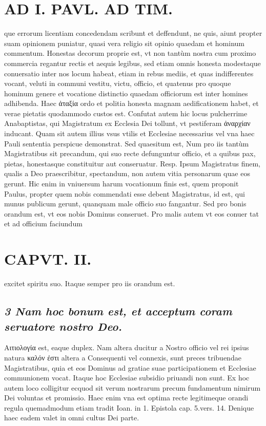 \documentclass{article}
\begin{document}
\begin{pages}
\section*{AD I. PAVL. AD TIM. }
\marginpar{[ p.50 ]}\pstart que errorum licentiam concedendam scribunt et deffendunt, ne quis, aiunt propter suam opinionem puniatur, quasi vera religio sit opinio quaedam et hominum commentum.  \pend\pstart Honestas decorum proprie est, vt non tantùm nostra cum proximo commercia regantur rectis et aequis legibus, sed etiam omnis honesta modestaque conuersatio inter nos locum habeat, etiam in rebus mediis, et quas indifferentes vocant, veluti in communi vestitu, victu, officio, et quatenus pro quoque hominum genere et vocatione distinctio quaedam officiorum est inter homines adhibenda. Haec ἀταξία ordo et politia honesta magnam aedificationem habet, et verae pietatis quodammodo custos est.  \pend\pstart Confutat autem hic locus pulcherrime Anabaptistas, qui Magistratum ex Ecclesia Dei tollunt, vt pestiferam ἀναρχίαν inducant. Quam sit autem illius vsus vtilis et Ecclesiae necessarius vel vna haec Pauli sententia perspicue demonstrat.  \pend\pstart Sed quaesitum est, Num pro iis tantùm Magistratibus sit precandum, qui suo recte defunguntur officio, et a quibus pax, pietas, honestasque constituitur aut conseruatur. Resp. Ipsum Magistratus finem, qualis a Deo praescribitur, spectandum, non autem vitia personarum quae eos gerunt. Hic enim in vniuersum harum vocationum finis est, quem proponit Paulus, propter quem nobis commendati esse debent Magistratus, id est, qui munus publicum gerunt, quanquam male officio suo fangantur. Sed pro bonis orandum est, vt eos nobis Dominus conseruet. Pro malis autem vt eos conuer tat et ad officium faciundum  \pend
\section*{CAPVT. II. }
\marginpar{[ p.51 ]}\pstart excitet spiritu suo. Itaque  semper pro iis orandum est.  \pend
{}
{}
\subsection*{\textit{3 Nam hoc bonum est, et acceptum coram seruatore nostro Deo. }}\pstart Αιτιολογία est, eaque duplex. Nam altera ducitur a Nostro officio vel rei ipsius natura καλόν ἐστι altera a Consequenti vel connexis, sunt preces tribuendae Magistratibus, quia et eos Dominus ad gratiae suae participationem et Ecclesiae communionem vocat. Itaque hoc Ecclesiae subsidio priuandi non sunt. Ex hoc autem loco colligitur ecquod sit verum nostrarum precum fundamentum nimirum Dei voluntas et promissio. Haec enim vna est optima recte legitimeque orandi regula quemadmodum etiam tradit Ioan. in 1. Epistola cap. 5.vers. 14. Denique haec eadem valet in omni cultus Dei parte.  \pend
{}
{}

\end{pages}
\end{document}
